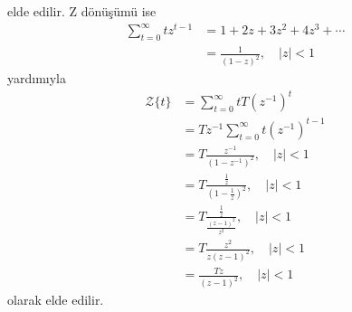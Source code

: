 \begin{enumerate}
\begin{equation}
\end{equation}
elde edilir. Z dönüşümü ise
\begin{equation}
    \begin{split}
        \sum_{t=0}^{\infty}t z^{t-1}&=1+2z+3z^2+4z^3+\cdots\\
        &=\frac{1}{(1-z)^2},\quad |z|<1
    \end{split}
\end{equation}
yardımıyla
\begin{equation}
    \begin{split}
        \mathcal{Z}\{t\}&=\sum_{t=0}^{\infty}tT (z^{-1})^{t}\\
        &=Tz^{-1}\sum_{t=0}^{\infty}t (z^{-1})^{t-1}\\
        &=T\frac{z^{-1}}{(1-z^{-1})^2},\quad |z|<1\\
        &=T\frac{\frac{1}{z}}{(1-\frac{1}{z})^2},\quad |z|<1\\
        &=T\frac{\frac{1}{z}}{\frac{(z-1)^2}{z^2}},\quad |z|<1\\
        &=T\frac{z^2}{z(z-1)^2},\quad |z|<1\\
        &=\frac{Tz}{(z-1)^2},\quad |z|<1
    \end{split}
\end{equation}
olarak elde edilir.
\end{enumerate}

